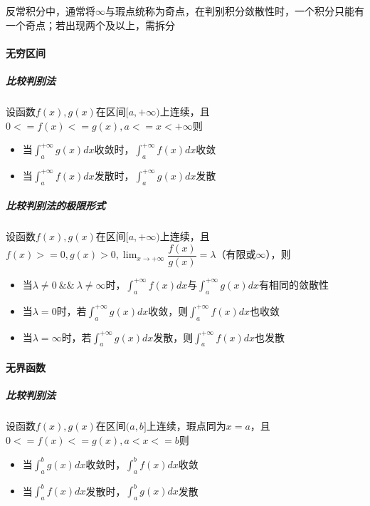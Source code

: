反常积分中，通常将\(\infty\)与瑕点统称为奇点，在判别积分敛散性时，一个积分只能有一个奇点；若出现两个及以上，需拆分

\paragraph{无穷区间}

\subparagraph{比较判别法}
设函数\(f(x), g(x)\)在区间\([a, +\infty)\)上连续，且\(0 <= f(x) <= g(x), a <= x < +\infty\)则
\begin{itemize}
    \item 当\(\displaystyle\int_a^{+\infty}g(x)dx\)收敛时，\(\displaystyle\int_a^{+\infty}f(x)dx\)收敛
    \item 当\(\displaystyle\int_a^{+\infty}f(x)dx\)发散时，\(\displaystyle\int_a^{+\infty}g(x)dx\)发散
\end{itemize}

\subparagraph{比较判别法的极限形式}
设函数\(f(x), g(x)\)在区间\([a, +\infty)\)上连续，且\(f(x) >= 0, g(x) > 0, \displaystyle\lim_{x \to +\infty}\dfrac{f(x)}{g(x)} = \lambda\)（有限或\(\infty\)），则
\begin{itemize}
    \item 当\(\lambda \neq 0\ \&\&\ \lambda \neq \infty\)时，\(\displaystyle\int_a^{+\infty}f(x)dx\)与\(\displaystyle\int_a^{+\infty}g(x)dx\)有相同的敛散性
    \item 当\(\lambda = 0\)时，若\(\displaystyle\int_a^{+\infty}g(x)dx\)收敛，则\(\displaystyle\int_a^{+\infty}f(x)dx\)也收敛
    \item 当\(\lambda = \infty\)时，若\(\displaystyle\int_a^{+\infty}g(x)dx\)发散，则\(\displaystyle\int_a^{+\infty}f(x)dx\)也发散
\end{itemize}


\paragraph{无界函数}

\subparagraph{比较判别法}
设函数\(f(x), g(x)\)在区间\((a, b]\)上连续，瑕点同为\(x = a\)，且\(0 <= f(x) <= g(x), a < x <= b \)则
\begin{itemize}
    \item 当\(\displaystyle\int_a^{b}g(x)dx\)收敛时，\(\displaystyle\int_a^{b}f(x)dx\)收敛
    \item 当\(\displaystyle\int_a^{b}f(x)dx\)发散时，\(\displaystyle\int_a^{b}g(x)dx\)发散
\end{itemize}

